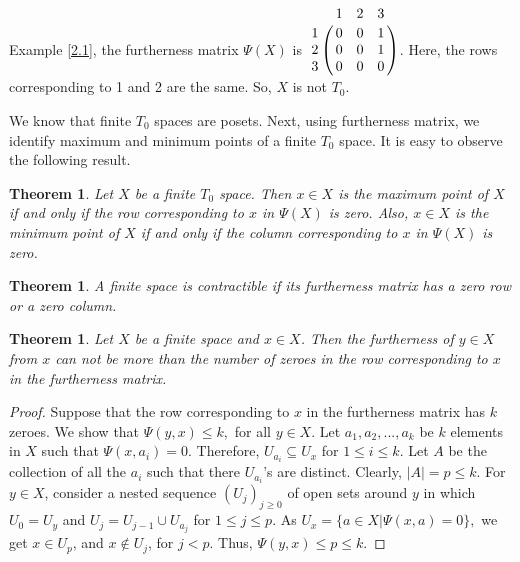 \documentclass[12pt]{amsart}
\newtheorem{theorem}[definition]{Theorem}
\begin{document}
Example \ref{2.1}, the furtherness matrix  $\Psi(X)$ is 
$\bordermatrix{ & 1 & 2 & 3  \cr
	1 &	0 & 0 & 1 \cr
	2 & 0 & 0 & 1 \cr
	3 &	0 & 0 & 0 }$. Here, the rows corresponding to 1 and 2 are the same. So, $X$ is not $T_0$.


We know that finite $T_0$ spaces are posets. Next, using furtherness matrix, we identify maximum and minimum points \cite{Barmak} of a finite $T_0$ space. It is easy to observe the following result.

\begin{theorem}
	Let $X$ be a finite $T_0$ space. Then $x\in X$ is the maximum point of $X$ if and only if the row corresponding to $x$ in $\Psi(X)$ is zero. Also, $x\in X$ is the minimum point of $X$ if and only if the column corresponding to $x$ in $\Psi(X)$ is zero.
\end{theorem}

\begin{theorem}
		A finite space is contractible if its furtherness matrix has a zero row or a zero  column.
\end{theorem}

\begin{theorem}
	Let $X$ be a finite space and $x\in X$. Then the furtherness of $y\in X$ from $x$ can not be more than the  number of zeroes in the row corresponding to $x$ in the furtherness matrix.
\end{theorem}
\begin{proof}
	Suppose that the row corresponding to $x$ in the furtherness matrix has $k$ zeroes. We show that $\Psi(y,x)\leq k,$ for all $y\in X$. Let  $a_1,a_2,...,a_k$ be $k$ elements in $X$ such that $\Psi(x,a_i)=0$. Therefore, $U_{a_i}\subseteq U_x$ for $1\leq i\leq k$. Let $A$ be the collection of all the $a_i$ such that there $U_{a_i}$'s are distinct. Clearly, $|A|=p\leq k$. For $y\in X$, consider a nested sequence $(U_j)_{j\geq0}$ of open sets around $y$ in which $U_0=U_y$ and $U_j=U_{j-1}\cup U_{a_j}$ for $1\leq j\leq p$. As $U_x=\{a\in X|\Psi(x,a)=0\},$ we get $x\in U_p$, and $x\notin U_j$, for $j<p$.
	Thus, $\Psi(y,x)\leq p \leq k$.
\end{proof}
\end{document}

